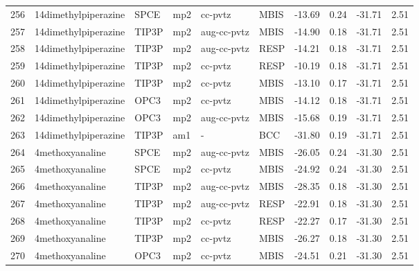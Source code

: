 \begin{tabular}{llllllrrrr}
256 &           14dimethylpiperazine &       SPCE &      mp2 &      cc-pvtz &         MBIS & -13.69 &      0.24 &      -31.71 &     2.51 \\
257 &           14dimethylpiperazine &      TIP3P &      mp2 &  aug-cc-pvtz &         MBIS & -14.90 &      0.18 &      -31.71 &     2.51 \\
258 &           14dimethylpiperazine &      TIP3P &      mp2 &  aug-cc-pvtz &         RESP & -14.21 &      0.18 &      -31.71 &     2.51 \\
259 &           14dimethylpiperazine &      TIP3P &      mp2 &      cc-pvtz &         RESP & -10.19 &      0.18 &      -31.71 &     2.51 \\
260 &           14dimethylpiperazine &      TIP3P &      mp2 &      cc-pvtz &         MBIS & -13.10 &      0.17 &      -31.71 &     2.51 \\
261 &           14dimethylpiperazine &       OPC3 &      mp2 &      cc-pvtz &         MBIS & -14.12 &      0.18 &      -31.71 &     2.51 \\
262 &           14dimethylpiperazine &       OPC3 &      mp2 &  aug-cc-pvtz &         MBIS & -15.68 &      0.19 &      -31.71 &     2.51 \\
263 &           14dimethylpiperazine &      TIP3P &      am1 &            - &          BCC & -31.80 &      0.19 &      -31.71 &     2.51 \\
264 &                4methoxyanaline &       SPCE &      mp2 &  aug-cc-pvtz &         MBIS & -26.05 &      0.24 &      -31.30 &     2.51 \\
265 &                4methoxyanaline &       SPCE &      mp2 &      cc-pvtz &         MBIS & -24.92 &      0.24 &      -31.30 &     2.51 \\
266 &                4methoxyanaline &      TIP3P &      mp2 &  aug-cc-pvtz &         MBIS & -28.35 &      0.18 &      -31.30 &     2.51 \\
267 &                4methoxyanaline &      TIP3P &      mp2 &  aug-cc-pvtz &         RESP & -22.91 &      0.18 &      -31.30 &     2.51 \\
268 &                4methoxyanaline &      TIP3P &      mp2 &      cc-pvtz &         RESP & -22.27 &      0.17 &      -31.30 &     2.51 \\
269 &                4methoxyanaline &      TIP3P &      mp2 &      cc-pvtz &         MBIS & -26.27 &      0.18 &      -31.30 &     2.51 \\
270 &                4methoxyanaline &       OPC3 &      mp2 &      cc-pvtz &         MBIS & -24.51 &      0.21 &      -31.30 &     2.51 \\

\end{tabular}
